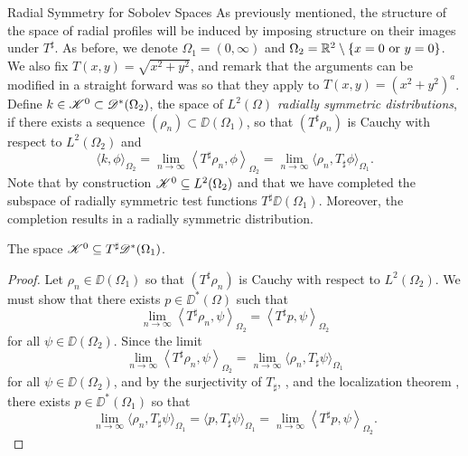 \begin{chapter}{Radial Symmetry for Sobolev Spaces}
As previously mentioned, the structure of the space of radial profiles will be induced by imposing structure on their images under $T^\sharp$.
As before, we denote $\Omega_1 = (0,\infty)$ and $\Omega_2 = \mathbb R^2\setminus\{x=0\text{ or }y=0\}$.  
We also fix $T(x,y) = \sqrt{x^2+y^2}$, and remark that the arguments can be modified in a straight forward was so that they apply to $T(x,y) = (x^2 + y^2)^a$. 
Define $k\in \mathscr K^0 \subset \mathscr D^*(\Omega_2)$, the space of \emph{$L^2(\Omega)$ radially symmetric distributions}, if there exists a sequence $(\rho_n) \subset \DD(\Omega_1)$, so that $(T^\sharp \rho_n)$ is Cauchy with respect to $L^2(\Omega_2)$ and
\begin{equation} \label{eq:cauchySequenceCorrespondence}
  \Big\langle k,\phi\Big\rangle_{\Omega_2} = \lim_{n\to\infty}\left\langle T^\sharp \rho_n, \phi\right\rangle_{\Omega_2} = \lim_{n\to\infty}\Big\langle \rho_n, T_\sharp \phi\Big\rangle_{\Omega_1}.
\end{equation}
Note that by construction $\mathscr K^0 \subseteq L^2(\Omega_2)$ and that we have completed the subspace of radially symmetric test functions $T^\sharp \DD(\Omega_1)$.
Moreover, the completion results in a radially symmetric distribution.
\begin{prop}
  The space $\mathscr K^0 \subseteq T^\sharp \mathscr D^*(\Omega_1)$.
\end{prop}
\begin{proof}
  Let $\rho_n \in \DD(\Omega_1)$ so that $(T^\sharp \rho_n)$ is Cauchy with respect to $L^2(\Omega_2)$.
  We must show that there exists $p \in \DD^*(\Omega)$ such that
  \begin{equation}
    \lim_{n\to\infty} \left\langle T^\sharp \rho_n,\psi\right\rangle_{\Omega_2} = \left\langle T^\sharp p,\psi \right\rangle_{\Omega_2}
  \end{equation}
  for all $\psi \in \DD(\Omega_2)$.
  Since the limit
  \begin{equation}
    \lim_{n\to\infty} \left\langle T^\sharp \rho_n, \psi \right\rangle_{\Omega_2}
    = \lim_{n\to\infty} \Big\langle \rho_n, T_\sharp \psi \Big\rangle_{\Omega_1}
  \end{equation}
  for all $\psi\in \DD(\Omega_2)$, and by the surjectivity of $T_\sharp$, , and the localization theorem , there exists $p \in \DD^*(\Omega_1)$ so that
  \begin{equation}
     \lim_{n\to\infty} \Big\langle \rho_n, T_\sharp \psi \Big\rangle_{\Omega_1} = \Big\langle p,T_\sharp \psi \Big\rangle_{\Omega_1} = \lim_{n\to\infty} \left\langle T^\sharp p, \psi \right\rangle_{\Omega_2}.
  \end{equation}
\end{proof}


\end{chapter}
